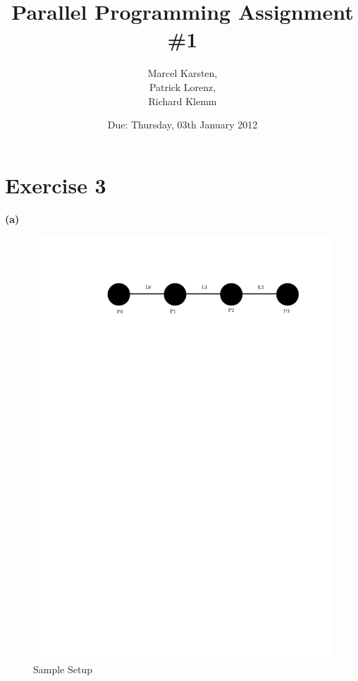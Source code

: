 \documentclass[a4paper,twoside,11pt]{article}
\begin{document}
\pagestyle{fancyplain}

\title{Parallel Programming Assignment \#1} 
\author{Marcel Karsten,\\ Patrick Lorenz,\\ Richard Klemm}
\date{Due: Thursday, 03th January 2012} %
\maketitle

\lhead{}
\renewcommand{\headrulewidth}{0px}



\section{Exercise 3}
\hspace{2em}\textbf{(a)}
\begin{figure}[!htbp]
    \begin{center}
        \includegraphics[scale=1]{3a_1.pdf}
    \end{center}
    \caption{Sample Setup}
    \label{SampleSetup}
\end{figure}
\end{document}
